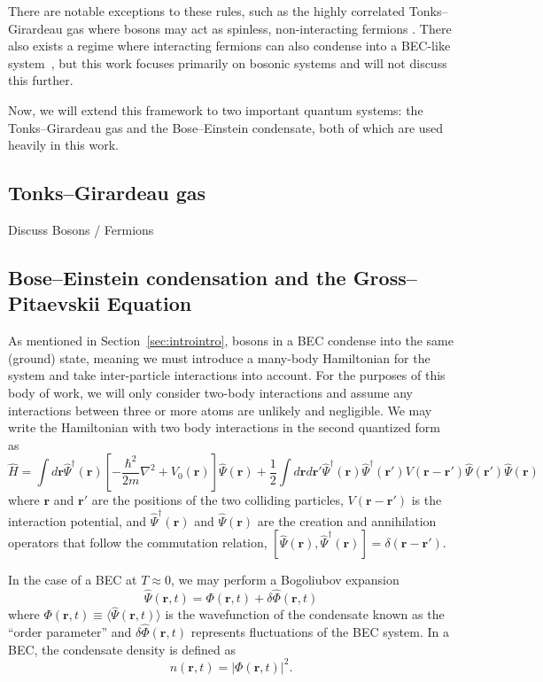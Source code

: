 There are notable exceptions to these rules, such as the highly correlated Tonks--Girardeau gas where bosons may act as spinless, non-interacting fermions \cite{Girardeau}.
There also exists a regime where interacting fermions can also condense into a BEC-like system~\cite{Nozieres1985, Bulgac2014}, but this work focuses primarily on bosonic systems and will not discuss this further.

Now, we will extend this framework to two important quantum systems: the Tonks--Girardeau gas and the Bose--Einstein condensate, both of which are used heavily in this work.

\subsection{Tonks--Girardeau gas}

Discuss Bosons / Fermions

\subsection{Bose--Einstein condensation and the Gross--Pitaevskii Equation}

As mentioned in Section~\ref{sec:introintro}, bosons in a BEC condense into the same (ground) state, meaning we must introduce a many-body Hamiltonian for the system and take inter-particle interactions into account.
For the purposes of this body of work, we will only consider two-body interactions and assume any interactions between three or more atoms are unlikely and negligible.
We may write the Hamiltonian with two body interactions in the second quantized form as
\begin{equation}
    \hat H = \int d\mathbf{r} \hat \Psi^\dagger(\mathbf{r})\left[-\frac{\hbar^2}{2m}\nabla^2 + V_0(\mathbf{r}) \right]\hat \Psi(\mathbf{r}) + \frac{1}{2} \int d\mathbf{r} d\mathbf{r'} \hat \Psi^\dagger(\mathbf{r}) \hat \Psi^\dagger(\mathbf{r'}) V(\mathbf{r} - \mathbf{r'})\hat \Psi(\mathbf{r'}) \hat \Psi(\mathbf{r})
    \label{eqn:2nd}
\end{equation}
where $\mathbf{r}$ and $\mathbf{r'}$ are the positions of the two colliding particles, $V(\mathbf{r}-\mathbf{r'})$ is the interaction potential, and $\hat \Psi^\dagger(\mathbf{r})$ and $\hat \Psi(\mathbf{r})$ are the creation and annihilation operators that follow the commutation relation, $[\hat \Psi(\mathbf{r}),\hat \Psi^\dagger(\mathbf{r})] = \delta(\mathbf{r} - \mathbf{r'})$.

In the case of a BEC at $T\approx0$, we may perform a Bogoliubov expansion~\cite{Bogoliubov1947, Dalfovo1999}
\begin{equation}
    \hat \Psi (\mathbf{r}, t) = \Phi(\mathbf{r},t) + \delta \hat \Phi(\mathbf{r},t)
\label{eqn:bog}
\end{equation}
where $\Phi(\mathbf{r},t) \equiv \langle \hat \Psi(\mathbf{r},t) \rangle$ is the wavefunction of the condensate known as the ``order parameter'' and $\delta \hat \Phi(\mathbf{r},t)$ represents fluctuations of the BEC system.
In a BEC, the condensate density is defined as
\begin{equation}
    n(\mathbf{r},t) = |\Phi(\mathbf{r},t)|^2.
\end{equation}

